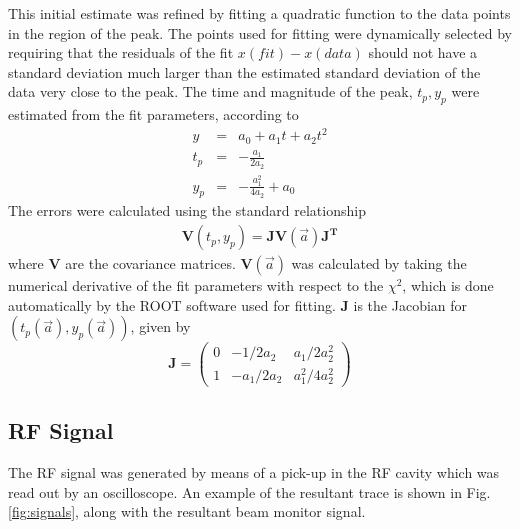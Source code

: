 \documentclass{paper}
\begin{document}
This initial estimate was refined by fitting a quadratic function to the
data points in the region of the peak. The points used for fitting were 
dynamically selected by requiring that the residuals of the fit $x(fit)-x(data)$
should not have a standard deviation much larger than the estimated standard 
deviation of the data very close to the peak. The time and magnitude of the 
peak, $t_p, y_p$ were estimated from the fit parameters, according to
\begin{eqnarray}
y &=& a_0 + a_1 t + a_2 t^2 \\
t_p &=& -\frac{a_1}{2a_2}  \\
y_p &=& -\frac{a_1^2}{4a_2}+a_0
\end{eqnarray}
The errors were calculated using the standard relationship
\begin{eqnarray}
\mathbf{V}(t_p, y_p) = \mathbf{J} \mathbf{V}(\vec{a}) \mathbf{J^T}
\end{eqnarray}
where $\mathbf{V}$ are the covariance matrices. $\mathbf{V}(\vec{a})$ was 
calculated by taking the numerical derivative of the fit parameters with respect 
to the $\chi^2$, which is done  automatically by the ROOT software used for 
fitting. $\mathbf{J}$ is the Jacobian for $(t_p(\vec{a}), y_p(\vec{a}))$, given
by
\begin{equation}
\mathbf{J} = \left(\begin{array}{ccc}
    0 & -1/2a_2 & a_1/2a_2^2 \\
    1 & -a_1/2a_2 & a_1^2/4a_2^2
\end{array}\right)
\end{equation}

\subsection{RF Signal}
The RF signal was generated by means of a pick-up in the RF cavity which was 
read out by an oscilloscope. An example of the resultant trace is shown in
Fig. \ref{fig:signals}, along with the resultant beam monitor signal.
\end{document}
